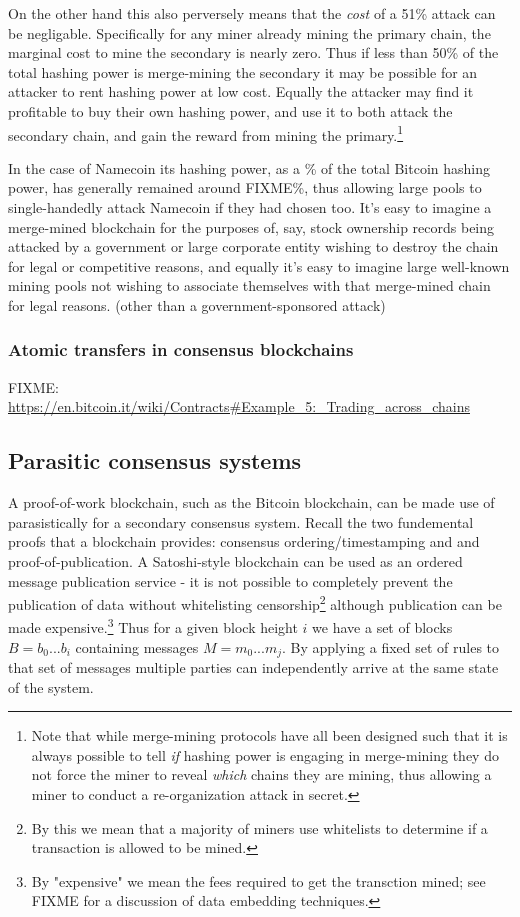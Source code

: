 \documentclass{article}
\begin{document}
On the other hand this also perversely means that the \emph{cost} of a 51\%
attack can be negligable. Specifically for any miner already mining the primary
chain, the marginal cost to mine the secondary is nearly zero.  Thus if less
than 50\% of the total hashing power is merge-mining the secondary it may be
possible for an attacker to rent hashing power at low cost. Equally the
attacker may find it profitable to buy their own hashing power, and use it to
both attack the secondary chain, and gain the reward from mining the
primary.\footnote{Note that while merge-mining protocols have all been designed
such that it is always possible to tell \emph{if} hashing power is engaging in
merge-mining they do not force the miner to reveal \emph{which} chains they are
mining, thus allowing a miner to conduct a re-organization attack in secret.}

In the case of Namecoin its hashing power, as a \% of the total Bitcoin hashing
power, has generally remained around FIXME\%, thus allowing large pools to
single-handedly attack Namecoin if they had chosen too. It's easy to imagine a
merge-mined blockchain for the purposes of, say, stock ownership records being
attacked by a government or large corporate entity wishing to destroy the chain
for legal or competitive reasons, and equally it's easy to imagine large
well-known mining pools not wishing to associate themselves with that
merge-mined chain for legal reasons. (other than a government-sponsored attack)


\subsubsection{Atomic transfers in consensus blockchains}

FIXME: \url{https://en.bitcoin.it/wiki/Contracts#Example_5:_Trading_across_chains}


\subsection{Parasitic consensus systems}

A proof-of-work blockchain, such as the Bitcoin blockchain, can be made use of
parasistically for a secondary consensus system. Recall the two fundemental
proofs that a blockchain provides: consensus ordering/timestamping and and
proof-of-publication. A Satoshi-style blockchain can be used as an ordered
message publication service - it is not possible to completely prevent the
publication of data without whitelisting censorship\footnote{By this we mean
    that a majority of miners use whitelists to determine if a transaction is
allowed to be mined.} although publication can be made expensive.\footnote{By
"expensive" we mean the fees required to get the transction mined; see FIXME
for a discussion of data embedding techniques.} Thus for a given block height
$i$ we have a set of blocks $B={b_0 ... b_i}$ containing messages $M={m_0 ...
m_j}$. By applying a fixed set of rules to that set of messages multiple
parties can independently arrive at the same state of the system.
\end{document}

